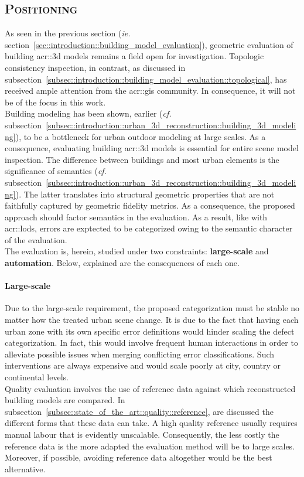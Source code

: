     \subsection{\textsc{Positioning}}
        \label{subsec::introduction::contributions::positioning}
        As seen in the previous section (\textit{ie.} section~\ref{sec::introduction::building_model_evaluation}), geometric evaluation of building \gls{acr::3d} models remains a field open for investigation.
        Topologic consistency inspection, in contrast, as discussed in subsection~\ref{subsec::introduction::building_model_evaluation::topological}, has received ample attention from the \gls{acr::gis} community.
        In consequence, it will not be of the focus in this work.\\

        Building modeling has been shown, earlier (\textit{cf.} subsection~\ref{subsec::introduction::urban_3d_reconstruction::building_3d_modeling}), to be a bottleneck for urban outdoor modeling at large scales.
        As a consequence, evaluating building \gls{acr::3d} models is essential for entire scene model inspection.
        The difference between buildings and most urban elements is the significance of semantics (\textit{cf.} subsection~\ref{subsec::introduction::urban_3d_reconstruction::building_3d_modeling}).
        The latter translates into structural geometric properties that are not faithfully captured by geometric fidelity metrics.
        As a consequence, the proposed approach should factor semantics in the evaluation.
        As a result, like with \glspl{acr::lod}, errors are exptected to be categorized owing to the semantic character of the evaluation.\\

        The evaluation is, herein, studied under two constraints: \textbf{large-scale} and \textbf{automation}.
        Below, explained are the consequences of each one.
        \paragraph{Large-scale}
            Due to the large-scale requirement, the proposed categorization must be stable no matter how the treated urban scene change.
            It is due to the fact that having each urban zone with its own specific error definitions would hinder scaling the defect categorization.
            In fact, this would involve frequent human interactions in order to alleviate possible issues when merging conflicting error classifications.
            Such interventions are always expensive and would scale poorly at city, country or continental levels.\\
            Quality evaluation involves the use of reference data against which reconstructed building models are compared.
            In subsection~\ref{subsec::state_of_the_art::quality::reference}, are discussed the different forms that these data can take.
            A high quality reference usually requires manual labour that is evidently unscalable.
            Consequently, the less costly the reference data is the more adapted the evaluation method will be to large scales.
            Moreover, if possible, avoiding reference data altogether would be the best alternative.

